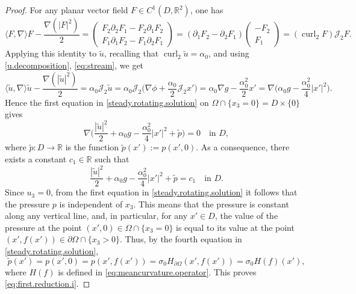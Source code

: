 \documentclass[10pt,reqno,a4paper]{article}
\numberwithin{equation}{section}
\theoremstyle{plain}
\theoremstyle{definition}
\newcommand{\R}{{\mathbb R}}
\newcommand{\mJ}{\mathcal{J}}
\newcommand{\Om}{\Omega}
\newcommand{\pa}{\partial}
\newcommand{\grad}{\nabla}
\newcommand{\curl}{\operatorname{curl}}
\begin{document}
\begin{proof} 
For any planar vector field $F \in C^1(D,\R^2)$, one has
\[
\langle F,\nabla\rangle F - \frac{\nabla (|F|^2)}{2}
= \begin{pmatrix}
F_2 \pa_2 F_1 - F_2 \pa_1 F_2 \\
F_1 \pa_1 F_2 - F_1 \pa_2 F_1
\end{pmatrix}
= (\pa_1 F_2 - \pa_2 F_1)
\begin{pmatrix}
- F_2 \\
F_1
\end{pmatrix}
= (\curl_2 F) \mJ_2 F.
\]
Applying this identity to $\tilde u$, 
recalling that $\curl_2 \tilde u = \alpha_0$, 
and using \eqref{u.decomposition}, \eqref{eq:stream},
we get 
\[
\langle \tilde u,\nabla \rangle \tilde u 
- \frac{ \nabla (|\tilde u|^2) }{2} 
= \alpha_0  \mJ_2 \tilde u
= \alpha_0  \mJ_2 \Big(\nabla \phi + \frac{\alpha_0}{2} \mJ_2 x' \Big)
= \alpha_0 \nabla g - \frac{\alpha_0^2}{2} x' 
= \grad \Big( \alpha_0 g - \frac{\alpha_0^2}{4} |x'|^2 \Big).
\] 
Hence the first equation in \eqref{steady.rotating.solution} 
on $\Om \cap \{ x_3 = 0 \} = D \times \{ 0 \}$ gives 
\[
\grad \Big( \frac{ |\tilde u|^2 }{2} + \alpha_0 g - \frac{\alpha_0^2}{4} |x'|^2 + \tilde p \Big) = 0 
\quad \text{in } D,
\]
where $\tilde p : D \to \R$ is the function $\tilde p(x') := p(x',0)$. 
As a consequence, there exists a constant $c_1 \in \R$ such that
\[
\frac{|\tilde u|^2}{2} + \alpha_0 g - \frac{\alpha_0^2}{4} |x'|^2 + \tilde p = c_1
\quad \text{in } D.
\]
Since $u_3=0$, from the first equation in \eqref{steady.rotating.solution} 
it follows that the pressure $p$ is independent of $x_3$. 
This means that the pressure is constant along any vertical line, 
and, in particular, for any $x' \in D$, 
the value of the pressure at the point $(x',0) \in \Om \cap \{ x_3 = 0\}$ 
is equal to its value at the point $(x', f(x')) \in \pa \Om \cap \{ x_3 > 0 \}$. 
Thus, by the fourth equation in \eqref{steady.rotating.solution}, 
\[
\tilde p(x') = p(x',0) = p(x', f(x')) = \sigma_0 H_{\pa \Omega}(x', f(x')) 
= \sigma_0 H(f)(x'),
\]
where $H(f)$ is defined in \eqref{eq:meancurvature.operator}. 
This proves \eqref{eq:first.reduction.i}. 


\end{proof}
\end{document}
